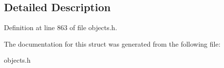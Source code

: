 \subsection{Detailed Description}


Definition at line 863 of file objects.\+h.



The documentation for this struct was generated from the following file\+:\begin{DoxyCompactItemize}
\item 
objects.\+h\end{DoxyCompactItemize}
